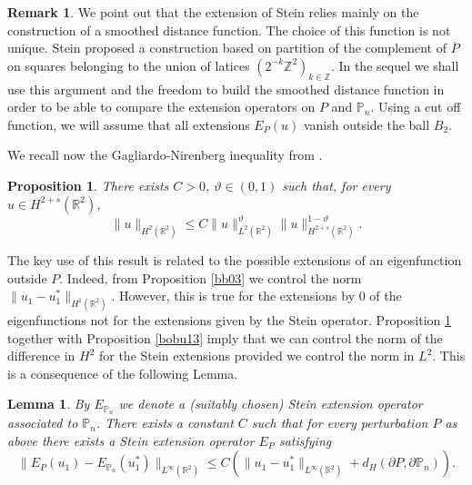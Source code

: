 \documentclass[11pt]{article}
\numberwithin{equation}{section}\newtheorem*{jepEnonce}{\jepEnonceTitle}\newenvironment{enonce*}[1]{\def\jepEnonceTitle{#1}\jepEnonce}{\endjepEnonce}\newtheorem*{conj*}{Conjecture}
\theoremstyle{plain}
\newtheorem{lemma}[thm]{Lemma}
\newtheorem{propo}[thm]{Proposition}
\theoremstyle{definition}
\newtheorem{rem}[thm]{Remark}
\newcommand{\thetathree}{\vartheta}
\let\Bbb\mathbb
\def\R{\mathbb{R}}
\def\Z{\mathbb{Z}}
\newcommand{\ov}{\overline}
\begin{document}
\begin{rem}
We point out that the extension of Stein relies mainly on the construction of a smoothed distance function. The choice of this function is not unique. Stein proposed a construction based on partition of the complement of $\ov P$ on squares belonging to the union of latices $(2^{-k} \Z^2)_{k \in \Z}$. In the sequel we shall use this argument and the freedom to build the smoothed distance function in order to be able to compare the extension operators on $P$ and $\mathbb P_n$. Using a cut off function, we will assume that all extensions $E_P(u)$ vanish outside the ball $B_2$.
\end{rem}

We recall now the Gagliardo-Nirenberg inequality from \cite{BrMi18}.
\begin{propo}\label{bobu14}
There exists $C\!>\!0$, $\thetathree \!\in\! (0,1)$ such that, for every $u \!\in\! H^{2+s} (\R^2)$,
\[
\|u\|_{H^{2} (\R^2)}\le C \| u\|_{L^2(\R^2)}^\thetathree \|u\|_{H^{2+s} (\R^2)}^{1-\thetathree}.
\]
\end{propo}
The key use of this result is related to the possible extensions of an eigenfunction outside $P$. Indeed, from Proposition \ref{bb03} we control the norm $\|u_1-u_1^*\|_{H^1(\R^2)} $. However, this is true for the extensions by $0$ of the eigenfunctions not for the extensions given by the Stein operator. Proposition \ref{bobu14} together with Proposition \ref{bobu13} imply that we can control the norm of the difference in $H^2$ for the Stein extensions provided we control the norm in $L^2$. This is a consequence of the following Lemma.
\begin{lemma}\label{bobu15}
By $E_{\Bbb P_n}$ we denote a (suitably chosen) Stein extension operator associated to $\Bbb P_n$. There exists a constant $C$ such that for every perturbation $P$ as above there exists a Stein extension operator $E_P$ satisfying
\begin{equation}\label{bobu21}
\|E_P(u_1)-E_{\Bbb P_n}(u_1^*)\|_{L^\infty(\R^2)}\le C (\|u_1-u_1^*\|_{L^\infty(\R^2)}+ d_H(\partial P, \partial \Bbb P_n)).
\end{equation}
\end{lemma}
\end{document}
